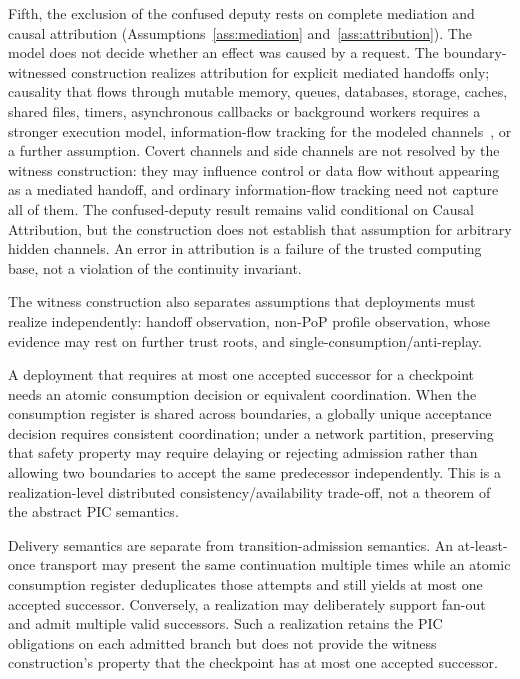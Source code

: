 \documentclass[10pt,twocolumn]{article}
\begin{document}
Fifth, the exclusion of the confused deputy rests on complete mediation and
causal attribution (Assumptions~\ref{ass:mediation}
and~\ref{ass:attribution}). The model does not decide whether an effect was
caused by a request. The boundary-witnessed construction realizes attribution
for explicit mediated handoffs only; causality that flows through mutable
memory, queues, databases, storage, caches, shared files, timers, asynchronous
callbacks or background workers requires a stronger execution model,
information-flow tracking for the modeled channels~\cite{myers1997decentralized},
or a further assumption.
Covert channels and side channels are not resolved by the witness construction:
they may influence control or data flow without appearing as a mediated
handoff, and ordinary information-flow tracking need not capture all of them.
The confused-deputy result remains valid conditional on Causal Attribution, but
the construction does not establish that assumption for arbitrary hidden
channels. An error in attribution is a failure of the trusted computing base,
not a violation of the continuity invariant.

The witness construction also separates assumptions that deployments must
realize independently: handoff observation, non-PoP profile observation,
whose evidence may rest on further trust roots, and
single-consumption/anti-replay.

A deployment that requires at most one accepted successor for a checkpoint
needs an atomic consumption decision or equivalent coordination. When the
consumption register is shared across boundaries, a globally unique acceptance
decision requires consistent coordination; under a network partition,
preserving that safety property may require delaying or rejecting admission
rather than allowing two boundaries to accept the same predecessor
independently. This is a realization-level distributed
consistency/availability trade-off, not a theorem of the abstract PIC
semantics.

Delivery semantics are separate from transition-admission semantics. An
at-least-once transport may present the same continuation multiple times while
an atomic consumption register deduplicates those attempts and still yields at
most one accepted successor. Conversely, a realization may deliberately
support fan-out and admit multiple valid successors. Such a realization retains
the PIC obligations on each admitted branch but does not provide the witness
construction's property that the checkpoint has at most one accepted
successor.
\end{document}
